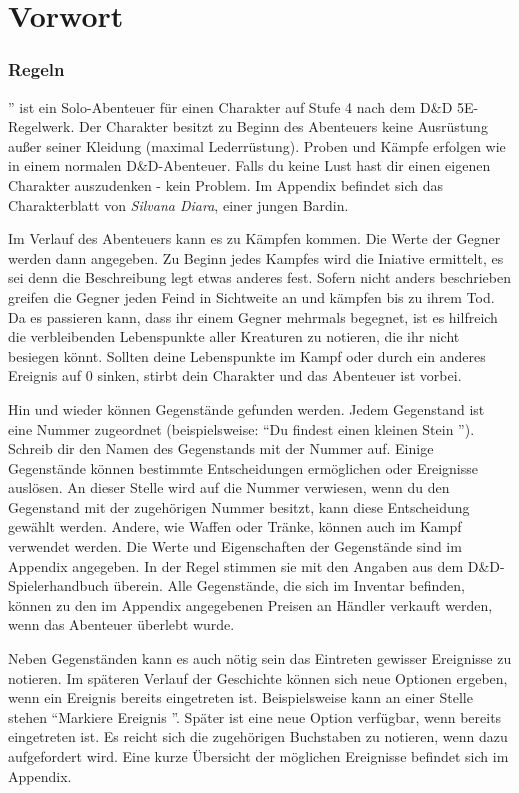 
\chapter*{Vorwort}

\subsection{Regeln}

'' ist ein Solo-Abenteuer für einen Charakter auf Stufe 4 nach dem D\&D 5E-Regelwerk. Der Charakter besitzt zu Beginn des Abenteuers keine Ausrüstung außer seiner Kleidung (maximal Lederrüstung). Proben und Kämpfe erfolgen wie in einem normalen D\&D-Abenteuer.
Falls du keine Lust hast dir einen eigenen Charakter auszudenken - kein Problem. Im Appendix befindet sich das Charakterblatt von \textit{Silvana Diara}, einer jungen Bardin.

Im Verlauf des Abenteuers kann es zu Kämpfen kommen. Die Werte der Gegner werden dann angegeben. Zu Beginn jedes Kampfes wird die Iniative ermittelt, es sei denn die Beschreibung legt etwas anderes fest. Sofern nicht anders beschrieben greifen die Gegner jeden Feind in Sichtweite an und kämpfen bis zu ihrem Tod. Da es passieren kann, dass ihr einem Gegner mehrmals begegnet, ist es hilfreich die verbleibenden Lebenspunkte aller Kreaturen zu notieren, die ihr nicht besiegen könnt. Sollten deine Lebenspunkte im Kampf oder durch ein anderes Ereignis auf 0 sinken, stirbt dein Charakter und das Abenteuer ist vorbei.

Hin und wieder können Gegenstände gefunden werden. Jedem Gegenstand ist eine Nummer zugeordnet (beispielsweise: ``Du findest einen kleinen Stein ''). Schreib dir den Namen des Gegenstands mit der Nummer auf. Einige Gegenstände können bestimmte Entscheidungen ermöglichen oder Ereignisse auslösen. An dieser Stelle wird auf die Nummer verwiesen, wenn du den Gegenstand mit der zugehörigen Nummer besitzt, kann diese Entscheidung gewählt werden. Andere, wie Waffen oder Tränke, können auch im Kampf verwendet werden. Die Werte und Eigenschaften der Gegenstände sind im Appendix angegeben. In der Regel stimmen sie mit den Angaben aus dem D\&D-Spielerhandbuch überein. Alle Gegenstände, die sich im Inventar befinden, können zu den im Appendix angegebenen Preisen an Händler verkauft werden, wenn das Abenteuer überlebt wurde.

Neben Gegenständen kann es auch nötig sein das Eintreten gewisser Ereignisse zu notieren. Im späteren Verlauf der Geschichte können sich neue Optionen ergeben, wenn ein Ereignis bereits eingetreten ist. Beispielsweise kann an einer Stelle stehen ``Markiere Ereignis ''. Später ist eine neue Option verfügbar, wenn  bereits eingetreten ist. Es reicht sich die zugehörigen Buchstaben zu notieren, wenn dazu aufgefordert wird. Eine kurze Übersicht der möglichen Ereignisse befindet sich im Appendix.

